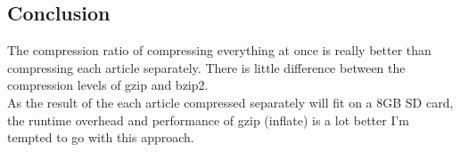 \documentclass{article}
\begin{document}
\subsection{Conclusion}
The compression ratio of compressing everything at once is really better than
compressing each article separately. There is little difference between the
compression levels of gzip and bzip2.\\
As the result of the each article compressed separately will fit on a 8GB SD
card, the runtime overhead and performance of gzip (inflate) is a lot better 
I'm tempted to go with this approach. 
\end{document}
